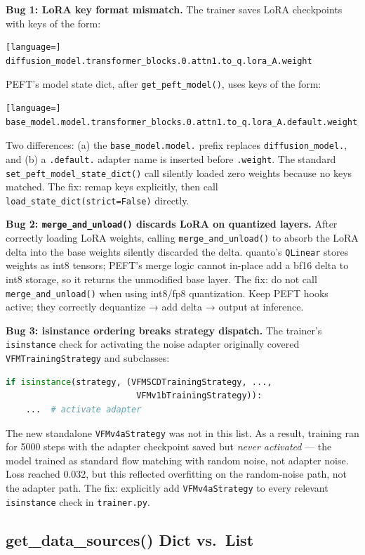 \documentclass[10pt,twocolumn]{article}
\begin{document}
\textbf{Bug 1: LoRA key format mismatch.}
The trainer saves LoRA checkpoints with keys of the form:
\begin{lstlisting}[language=]
diffusion_model.transformer_blocks.0.attn1.to_q.lora_A.weight
\end{lstlisting}
PEFT's model state dict, after \texttt{get\_peft\_model()}, uses keys of the form:
\begin{lstlisting}[language=]
base_model.model.transformer_blocks.0.attn1.to_q.lora_A.default.weight
\end{lstlisting}
Two differences: (a) the \texttt{base\_model.model.} prefix replaces \texttt{diffusion\_model.}, and (b) a \texttt{.default.} adapter name is inserted before \texttt{.weight}. The standard \texttt{set\_peft\_model\_state\_dict()} call silently loaded zero weights because no keys matched. The fix: remap keys explicitly, then call \texttt{load\_state\_dict(strict=False)} directly.

\textbf{Bug 2: \texttt{merge\_and\_unload()} discards LoRA on quantized layers.}
After correctly loading LoRA weights, calling \texttt{merge\_and\_unload()} to absorb the LoRA delta into the base weights silently discarded the delta. quanto's \texttt{QLinear} stores weights as int8 tensors; PEFT's merge logic cannot in-place add a bf16 delta to int8 storage, so it returns the unmodified base layer. The fix: do not call \texttt{merge\_and\_unload()} when using int8/fp8 quantization. Keep PEFT hooks active; they correctly dequantize → add delta → output at inference.

\textbf{Bug 3: isinstance ordering breaks strategy dispatch.}
The trainer's \texttt{isinstance} check for activating the noise adapter originally covered \texttt{VFMTrainingStrategy} and subclasses:
\begin{lstlisting}[language=Python]
if isinstance(strategy, (VFMSCDTrainingStrategy, ...,
                          VFMv1bTrainingStrategy)):
    ...  # activate adapter
\end{lstlisting}
The new standalone \texttt{VFMv4aStrategy} was not in this list. As a result, training ran for 5000 steps with the adapter checkpoint saved but \emph{never activated} — the model trained as standard flow matching with random noise, not adapter noise. Loss reached 0.032, but this reflected overfitting on the random-noise path, not the adapter path. The fix: explicitly add \texttt{VFMv4aStrategy} to every relevant \texttt{isinstance} check in \texttt{trainer.py}.

\subsection{get\_data\_sources() Dict vs.\ List}
\end{document}
